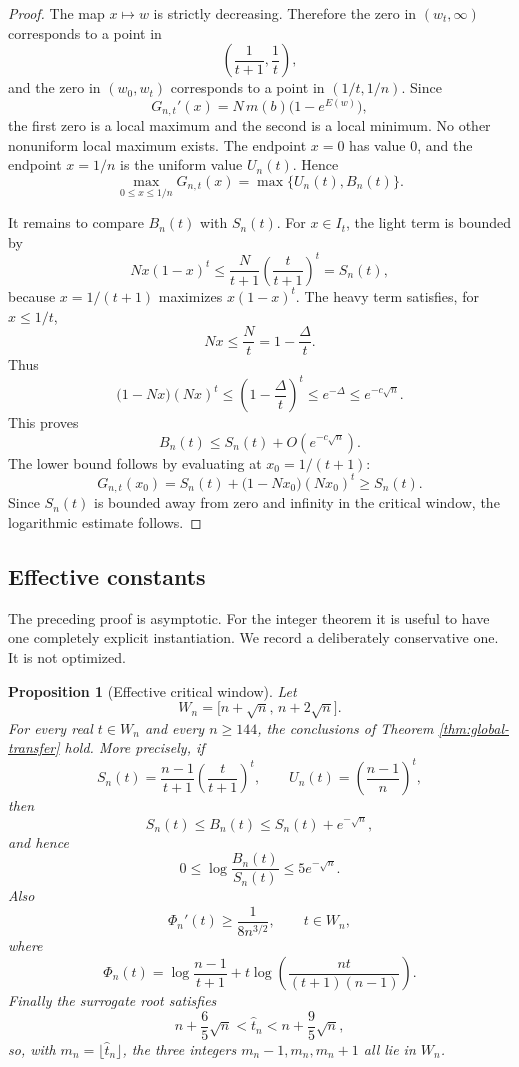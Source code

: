 \documentclass[11pt]{article}
\newtheorem{proposition}[theorem]{Proposition}
\theoremstyle{definition}
\begin{document}
\begin{proof}
The map $x\mapsto w$ is strictly decreasing. Therefore the zero in $(w_t,\infty)$ corresponds to a point in
\[
  \left(\frac1{t+1},\frac1t\right),
\]
and the zero in $(w_0,w_t)$ corresponds to a point in $(1/t,1/n)$. Since
\[
  G_{n,t}'(x)=N\,m(b)\bigl(1-e^{E(w)}\bigr),
\]
the first zero is a local maximum and the second is a local minimum. No other nonuniform local maximum exists. The endpoint $x=0$ has value $0$, and the endpoint $x=1/n$ is the uniform value $U_n(t)$. Hence
\[
  \max_{0\le x\le 1/n}G_{n,t}(x)=\max\{U_n(t),B_n(t)\}.
\]

It remains to compare $B_n(t)$ with $S_n(t)$. For $x\in I_t$, the light term is bounded by
\[
  N x(1-x)^t\le \frac{N}{t+1}\left(\frac{t}{t+1}\right)^t=S_n(t),
\]
because $x=1/(t+1)$ maximizes $x(1-x)^t$. The heavy term satisfies, for $x\le 1/t$,
\[
  Nx\le \frac Nt=1-\frac{\Delta}{t}.
\]
Thus
\[
  \bigl(1-Nx\bigr)(Nx)^t\le \left(1-\frac{\Delta}{t}\right)^t\le e^{-\Delta}\le e^{-c\sqrt n}.
\]
This proves
\[
  B_n(t)\le S_n(t)+O(e^{-c\sqrt n}).
\]
The lower bound follows by evaluating at $x_0=1/(t+1)$:
\[
  G_{n,t}(x_0)=S_n(t)+\bigl(1-Nx_0\bigr)(Nx_0)^t\ge S_n(t).
\]
Since $S_n(t)$ is bounded away from zero and infinity in the critical window, the logarithmic estimate follows.
\end{proof}

\subsection{Effective constants}

The preceding proof is asymptotic.  For the integer theorem it is useful to have one completely explicit instantiation.  We record a deliberately conservative one.  It is not optimized.

\begin{proposition}[Effective critical window]\label{prop:effective-window}
Let
\[
  W_n=\bigl[n+\sqrt n,\,n+2\sqrt n\bigr].
\]
For every real $t\in W_n$ and every $n\ge 144$, the conclusions of Theorem \ref{thm:global-transfer} hold.  More precisely, if
\[
  S_n(t)=\frac{n-1}{t+1}\left(\frac{t}{t+1}\right)^t,
  \qquad
  U_n(t)=\left(\frac{n-1}{n}\right)^t,
\]
then
\[
  S_n(t)\le B_n(t)\le S_n(t)+e^{-\sqrt n},
\]
and hence
\[
  0\le \log\frac{B_n(t)}{S_n(t)}\le 5e^{-\sqrt n}.
\]
Also
\[
  \Phi_n'(t)\ge \frac{1}{8n^{3/2}},
  \qquad t\in W_n,
\]
where
\[
  \Phi_n(t)=\log\frac{n-1}{t+1}+t\log\left(\frac{nt}{(t+1)(n-1)}\right).
\]
Finally the surrogate root satisfies
\[
  n+\frac65\sqrt n<\widehat t_n<n+\frac95\sqrt n,
\]
so, with $m_n=\lfloor \widehat t_n\rfloor$, the three integers $m_n-1,m_n,m_n+1$ all lie in $W_n$.
\end{proposition}
\end{document}
